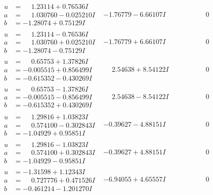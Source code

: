 \documentclass[1p]{elsarticle_modified}
\theoremstyle{definition}
\begin{document}
$$\begin{array}{c|c|c}
\begin{aligned}
u &= \phantom{-}1.23114 + 0.76536 I \\
a &= \phantom{-}1.030760 - 0.025210 I \\
b &= -1.28074 + 0.75129 I\end{aligned}
 & -1.76779 - 6.66107 I & \phantom{-0.000000 } 0 \\ \hline\begin{aligned}
u &= \phantom{-}1.23114 - 0.76536 I \\
a &= \phantom{-}1.030760 + 0.025210 I \\
b &= -1.28074 - 0.75129 I\end{aligned}
 & -1.76779 + 6.66107 I & \phantom{-0.000000 } 0 \\ \hline\begin{aligned}
u &= \phantom{-}0.65753 + 1.37826 I \\
a &= -0.005515 + 0.856499 I \\
b &= -0.615352 - 0.430269 I\end{aligned}
 & \phantom{-}2.54638 + 8.54122 I & \phantom{-0.000000 } 0 \\ \hline\begin{aligned}
u &= \phantom{-}0.65753 - 1.37826 I \\
a &= -0.005515 - 0.856499 I \\
b &= -0.615352 + 0.430269 I\end{aligned}
 & \phantom{-}2.54638 - 8.54122 I & \phantom{-0.000000 } 0 \\ \hline\begin{aligned}
u &= \phantom{-}1.29816 + 1.03823 I \\
a &= \phantom{-}0.574100 - 0.302843 I \\
b &= -1.04929 + 0.95851 I\end{aligned}
 & -0.39627 - 4.88151 I & \phantom{-0.000000 } 0 \\ \hline\begin{aligned}
u &= \phantom{-}1.29816 - 1.03823 I \\
a &= \phantom{-}0.574100 + 0.302843 I \\
b &= -1.04929 - 0.95851 I\end{aligned}
 & -0.39627 + 4.88151 I & \phantom{-0.000000 } 0 \\ \hline\begin{aligned}
u &= -1.31598 + 1.12343 I \\
a &= \phantom{-}0.727776 + 0.471526 I \\
b &= -0.461214 - 1.201270 I\end{aligned}
 & -6.94055 + 4.65557 I & \phantom{-0.000000 } 0 \\ \hline\begin{aligned}

\end{aligned}
\end{array}$$
\end{document}
